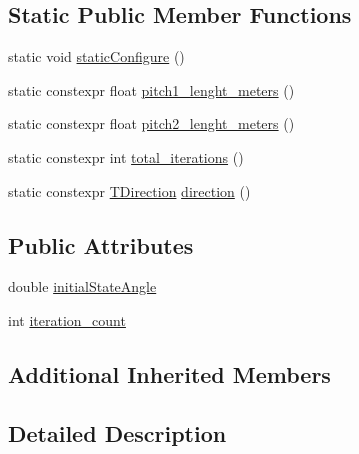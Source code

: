 \subsection*{Static Public Member Functions}
\begin{DoxyCompactItemize}
\item 
static void \hyperlink{structsm__ridgeback__floor__coverage__dynamic__1_1_1SS5_1_1SsSPattern1_a5ad7411b622f8c1453245e981b61bae2}{static\+Configure} ()
\item 
static constexpr float \hyperlink{structsm__ridgeback__floor__coverage__dynamic__1_1_1SS5_1_1SsSPattern1_a5ce4d6025eb7658f93d15dd677f8481d}{pitch1\+\_\+lenght\+\_\+meters} ()
\item 
static constexpr float \hyperlink{structsm__ridgeback__floor__coverage__dynamic__1_1_1SS5_1_1SsSPattern1_a7542598914a3530a60e4d3c16ccb1b14}{pitch2\+\_\+lenght\+\_\+meters} ()
\item 
static constexpr int \hyperlink{structsm__ridgeback__floor__coverage__dynamic__1_1_1SS5_1_1SsSPattern1_a41bd5d1e49e44522ac0fe3eac24cdcb6}{total\+\_\+iterations} ()
\item 
static constexpr \hyperlink{namespacesm__ridgeback__floor__coverage__dynamic__1_1_1SS5_ac4b517bcfa16bb73b577c12b354754e5}{T\+Direction} \hyperlink{structsm__ridgeback__floor__coverage__dynamic__1_1_1SS5_1_1SsSPattern1_a047fb857d6792b3f156fc96e1a2a5de4}{direction} ()
\end{DoxyCompactItemize}
\subsection*{Public Attributes}
\begin{DoxyCompactItemize}
\item 
double \hyperlink{structsm__ridgeback__floor__coverage__dynamic__1_1_1SS5_1_1SsSPattern1_a0e3dc20cdc35765699284f52f8df2e60}{initial\+State\+Angle}
\item 
int \hyperlink{structsm__ridgeback__floor__coverage__dynamic__1_1_1SS5_1_1SsSPattern1_af3d6066666a9e04b9ecfac47090c4a5d}{iteration\+\_\+count}
\end{DoxyCompactItemize}
\subsection*{Additional Inherited Members}


\subsection{Detailed Description}



